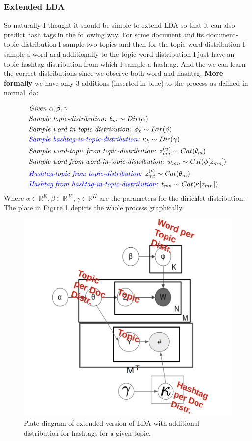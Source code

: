 \documentclass[10pt,conference,compsocconf]{IEEEtran}
\newcommand\R{\mathbb{R}}
\begin{document}
\subsubsection{Extended LDA}
So naturally I thought it should be simple to extend LDA so that it can also predict hash tags in the following way. For some document and its document-topic distribution I sample two topics and then for the topic-word distribution I sample a word and additionally to the topic-word distribution I just have an topic-hashtag distribution from which I sample a hashtag. And the we can learn the correct distributions since we observe both word and hashtag. \textbf{More formally} we have only 3 additions (inserted in blue) to the process as defined in normal lda: 

\small
\begin{align*}
&\textit{Given } \alpha, \beta, \gamma \\
&\textit{Sample topic-distribution: } \theta_m \sim Dir(\alpha)\\
&\textit{Sample word-in-topic-distribution: } \phi_k \sim Dir(\beta) \\
& \textcolor{blue}{\textit{Sample hashtag-in-topic-distribution: }} \kappa_k \sim Dir(\gamma) \\
&\textit{Sample word-topic from topic-distribution: } z^{(w)}_{mn} \sim Cat(\theta_m) \\
&\textit{Sample word from word-in-topic-distribution: } w_{mn} \sim Cat(\phi[z_{mn}])\\
&\textcolor{blue}{\textit{Hashtag-topic from topic-distribution: }} z^{(t)}_{mt} \sim Cat(\theta_m) \\
&\textcolor{blue}{\textit{Hashtag from hashtag-in-topic-distribution: }} t_{mn} \sim Cat(\kappa[z_{mn}])\\
\end{align*}
\normalsize
Where $\alpha \in \R^K, \beta \in \R^{|V|}, \gamma \in \R^K$ are the parameters for the dirichlet distribution. The plate in Figure \ref{fig:ldaplate2} depicts the whole process graphically.
\begin{figure}
	\centering
	\includegraphics[width=0.7\linewidth]{images/extended_lda}
	\caption{Plate diagram of extended version of LDA with additional distribution for hashtags for a given topic. }
	\label{fig:ldaplate2}
\end{figure}
\end{document}
